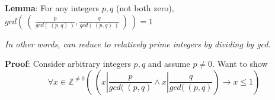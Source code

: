 
{\bf Lemma}: For any integers $p, q$ (not both zero), 
$gcd \left(~ \left(~\frac{p}{gcd(~(p,q)~)}, \frac{q}{gcd(~(p,q)~)} ~\right) ~\right) = 1$

{\it In other words, can reduce to relatively prime integers by dividing by gcd.}

{\bf Proof}: Consider arbitrary integers $p, q$ and assume $p \neq 0$. Want to show
\[
    \forall x \in \mathbb{Z}^{\neq 0} \left( ~\left( x | \frac{p}{gcd(~(p,q)} \land x |\frac{q}{gcd(~(p,q)} \right) \to 
    x \leq 1 \right)
\]
